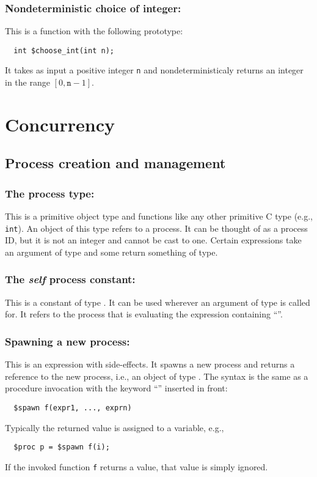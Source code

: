 \subsection{Nondeterministic choice of integer: \cchooseint}

This is a function with the following prototype:
\begin{verbatim}
  int $choose_int(int n);
\end{verbatim}
It takes as input a positive integer \texttt{n} and
nondeterministicaly returns an integer in the range
$[0,\texttt{n}-1]$.


\chapter{Concurrency}

\section{Process creation and management}

\subsection{The process type: \cproc}

This is a primitive object type and functions like any other primitive
C type (e.g., \texttt{int}). An object of this type refers to a
process. It can be thought of as a process ID, but it is not an
integer and cannot be cast to one. Certain expressions take an
argument of \cproc{} type and some return something of \cproc{} type.

\subsection{The \emph{self} process constant: \cself}

This is a constant of type \cproc. It can be used wherever an argument
of type \cproc{} is called for. It refers to the process that is
evaluating the expression containing ``\cself''.

\subsection{Spawning a new process: \cspawn}

This is an expression with side-effects.  It
spawns a new process and returns a reference to the new process, i.e.,
an object of type \cproc.  The syntax is the same as a procedure
invocation with the keyword ``\cspawn'' inserted in front:
\begin{verbatim}
  $spawn f(expr1, ..., exprn)
\end{verbatim}
Typically the returned value is assigned to a variable, e.g.,
\begin{verbatim}
  $proc p = $spawn f(i);
\end{verbatim}
If the invoked function \texttt{f} returns a value, that value is
simply ignored.

